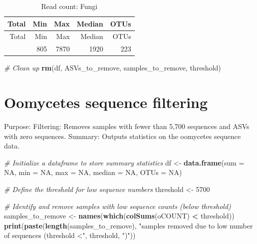 \documentclass[
  11pt,
]{article}
\newenvironment{Shaded}{\begin{snugshade}}{\end{snugshade}}
\newcommand{\AttributeTok}[1]{\textcolor[rgb]{0.13,0.29,0.53}{#1}}
\newcommand{\CommentTok}[1]{\textcolor[rgb]{0.56,0.35,0.01}{\textit{#1}}}
\newcommand{\ConstantTok}[1]{\textcolor[rgb]{0.56,0.35,0.01}{#1}}
\newcommand{\DecValTok}[1]{\textcolor[rgb]{0.00,0.00,0.81}{#1}}
\newcommand{\FunctionTok}[1]{\textcolor[rgb]{0.13,0.29,0.53}{\textbf{#1}}}
\newcommand{\NormalTok}[1]{#1}
\newcommand{\OtherTok}[1]{\textcolor[rgb]{0.56,0.35,0.01}{#1}}
\newcommand{\SpecialCharTok}[1]{\textcolor[rgb]{0.81,0.36,0.00}{\textbf{#1}}}
\newcommand{\StringTok}[1]{\textcolor[rgb]{0.31,0.60,0.02}{#1}}
\begin{document}
\begin{longtable}[]{@{}rrrrr@{}}
\caption{Read count: Fungi}\tabularnewline
\toprule\noalign{}
Total & Min & Max & Median & OTUs \\
\midrule\noalign{}
\endfirsthead
\toprule\noalign{}
Total & Min & Max & Median & OTUs \\
\midrule\noalign{}
\endhead
\bottomrule\noalign{}
\endlastfoot
134267 & 805 & 7870 & 1920 & 223 \\
\end{longtable}

\begin{Shaded}
\begin{Highlighting}[]
\CommentTok{\# Clean up}
\FunctionTok{rm}\NormalTok{(df, ASVs\_to\_remove, samples\_to\_remove, threshold)}
\end{Highlighting}
\end{Shaded}

\section{Oomycetes sequence
filtering}\label{oomycetes-sequence-filtering}

Purpose: Filtering: Removes samples with fewer than 5,700 sequences and
ASVs with zero sequences. Summary: Outputs statistics on the oomycetes
sequence data.

\begin{Shaded}
\begin{Highlighting}[]
\CommentTok{\# Initialize a dataframe to store summary statistics}
\NormalTok{df }\OtherTok{\textless{}{-}} \FunctionTok{data.frame}\NormalTok{(}\AttributeTok{sum =} \ConstantTok{NA}\NormalTok{, }\AttributeTok{min =} \ConstantTok{NA}\NormalTok{, }\AttributeTok{max =} \ConstantTok{NA}\NormalTok{, }\AttributeTok{median =} \ConstantTok{NA}\NormalTok{, }\AttributeTok{OTUs =} \ConstantTok{NA}\NormalTok{)}

\CommentTok{\# Define the threshold for low sequence numbers}
\NormalTok{threshold }\OtherTok{\textless{}{-}} \DecValTok{5700}

\CommentTok{\# Identify and remove samples with low sequence counts (below threshold)}
\NormalTok{samples\_to\_remove }\OtherTok{\textless{}{-}} \FunctionTok{names}\NormalTok{(}\FunctionTok{which}\NormalTok{(}\FunctionTok{colSums}\NormalTok{(oCOUNT) }\SpecialCharTok{\textless{}}\NormalTok{ threshold))}
\FunctionTok{print}\NormalTok{(}\FunctionTok{paste}\NormalTok{(}\FunctionTok{length}\NormalTok{(samples\_to\_remove), }\StringTok{"samples removed due to low number of sequences (threshold \textless{}"}\NormalTok{, threshold, }\StringTok{")"}\NormalTok{))}
\end{Highlighting}
\end{Shaded}
\end{document}
